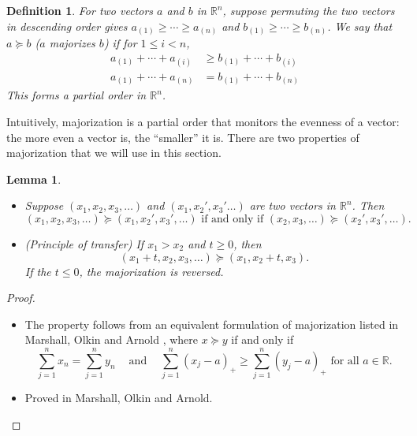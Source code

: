 \documentclass[11pt]{article}
\newtheorem{definition}{Definition}
\newtheorem{lemma}{Lemma}
\newcommand{\RR}{\mathbb{R}}
\begin{document}
\begin{definition}
For two vectors $a$ and $b$ in $\RR^n$, suppose permuting the two vectors in descending order gives
$a_{\left(1\right)} \ge \cdots \ge a_{\left(n\right)}$ and $b_{\left(1\right)} \ge \cdots \ge b_{\left(n\right)}$. We say that $a \succeq b$ ($a$ majorizes $b$) if for $1 \le i < n$,
\begin{align*}
a_{\left(1\right)} + \cdots + a_{\left(i\right)} & \ge b_{\left(1\right)} + \cdots + b_{\left(i\right)} \\
a_{\left(1\right)} + \cdots + a_{\left(n\right)} & = b_{\left(1\right)} + \cdots + b_{\left(n\right)}
\end{align*}
This forms a partial order in $\RR^n$.
\end{definition}

Intuitively, majorization is a partial order that monitors the evenness of a vector: the more even a vector is, the ``smaller'' it is. There are two properties of majorization that we will use in this section.

\begin{lemma}
\label{lma:two_properties}
\begin{itemize}
\item Suppose $\left(x_1, x_2, x_3, \ldots\right)$ and $\left(x_1, x_2', x_3' \ldots\right)$ are two vectors in $\RR^n$. Then
$$\left(x_1, x_2, x_3, \ldots\right) \succeq \left(x_1, x_2', x_3', \ldots\right) \text{ if and only if } \left(x_2, x_3, \ldots\right) \succeq \left(x_2', x_3', \ldots\right).$$
\item (Principle of transfer) If $x_1 > x_2$ and $t \ge 0$, then
$$\left(x_1 + t, x_2, x_3, \ldots\right) \succeq \left(x_1, x_2 + t, x_3\right).$$
If the $t \le 0$, the majorization is reversed.
\end{itemize}
\end{lemma}

\begin{proof}
\begin{itemize}

\item The property follows from an equivalent formulation of majorization listed in Marshall, Olkin and Arnold \cite{Marshall:2010hb}, where $x \succeq y$ if and only if
$$\sum_{j=1}^n x_n = \sum_{j=1}^n y_n ~~~~ \text{ and } ~~~~ \sum_{j=1}^n \left(x_j - a\right)_+ \ge \sum_{j=1}^n \left(y_j - a\right)_+ \text{ for all } a \in \RR.$$

\item Proved in Marshall, Olkin and Arnold.

\end{itemize}
\end{proof}
\end{document}
